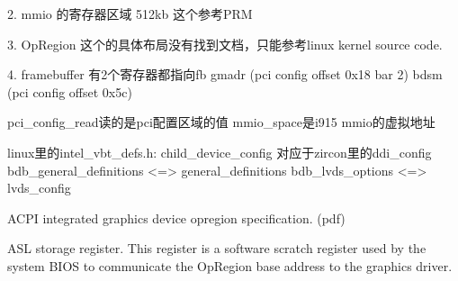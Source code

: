 2. mmio 的寄存器区域 512kb
  这个参考PRM

3. OpRegion
  这个的具体布局没有找到文档，只能参考linux kernel source code.

4. framebuffer
  有2个寄存器都指向fb
  gmadr (pci config offset 0x18 bar 2)
  bdsm (pci config offset 0x5c)

pci_config_read读的是pci配置区域的值
mmio_space是i915 mmio的虚拟地址


linux里的intel_vbt_defs.h: 
child_device_config 对应于zircon里的ddi_config
bdb_general_definitions <=> general_definitions
bdb_lvds_options <=> lvds_config


ACPI integrated graphics device opregion specification. (pdf)

ASL storage register. This register is a software scratch register used by the
system BIOS to communicate the OpRegion base address to the graphics driver.

